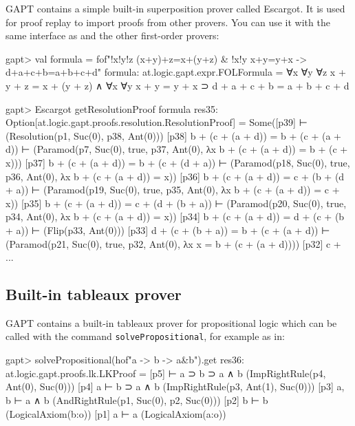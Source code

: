 \documentclass[a4paper,11pt]{article}
\newcommand{\cli}[1]{{\ttfamily {#1}}}
\begin{document}
GAPT contains a simple built-in superposition prover called Escargot.  It is
used for proof replay to import proofs from other provers.  You can use it with
the same interface as \cli{Prover9} and the other first-order provers:

\begin{clilisting}
gapt> val formula = fof"!x!y!z (x+y)+z=x+(y+z) & !x!y x+y=y+x -> d+a+c+b=a+b+c+d"
formula: at.logic.gapt.expr.FOLFormula =
∀x ∀y ∀z x + y + z = x + (y + z) ∧ ∀x ∀y x + y = y + x ⊃
  d + a + c + b = a + b + c + d

gapt> Escargot getResolutionProof formula
res35: Option[at.logic.gapt.proofs.resolution.ResolutionProof] =
Some([p39]  ⊢    (Resolution(p1, Suc(0), p38, Ant(0)))
[p38] b + (c + (a + d)) = b + (c + (a + d)) ⊢    (Paramod(p7, Suc(0), true, p37, Ant(0), λx b + (c + (a + d)) = b + (c + x)))
[p37] b + (c + (a + d)) = b + (c + (d + a)) ⊢    (Paramod(p18, Suc(0), true, p36, Ant(0), λx b + (c + (a + d)) = x))
[p36] b + (c + (a + d)) = c + (b + (d + a)) ⊢    (Paramod(p19, Suc(0), true, p35, Ant(0), λx b + (c + (a + d)) = c + x))
[p35] b + (c + (a + d)) = c + (d + (b + a)) ⊢    (Paramod(p20, Suc(0), true, p34, Ant(0), λx b + (c + (a + d)) = x))
[p34] b + (c + (a + d)) = d + (c + (b + a)) ⊢    (Flip(p33, Ant(0)))
[p33] d + (c + (b + a)) = b + (c + (a + d)) ⊢    (Paramod(p21, Suc(0), true, p32, Ant(0), λx x = b + (c + (a + d))))
[p32] c + ...
\end{clilisting}

\subsection{Built-in tableaux prover}

GAPT contains a  built-in tableaux prover for propositional logic
which can be called with the command \texttt{solvePropositional}, for example as in:
\begin{clilisting}
gapt> solvePropositional(hof"a -> b -> a&b").get
res36: at.logic.gapt.proofs.lk.LKProof =
[p5]  ⊢ a ⊃ b ⊃ a ∧ b    (ImpRightRule(p4, Ant(0), Suc(0)))
[p4] a ⊢ b ⊃ a ∧ b    (ImpRightRule(p3, Ant(1), Suc(0)))
[p3] a, b ⊢ a ∧ b    (AndRightRule(p1, Suc(0), p2, Suc(0)))
[p2] b ⊢ b    (LogicalAxiom(b:o))
[p1] a ⊢ a    (LogicalAxiom(a:o))

\end{clilisting}
\end{document}
